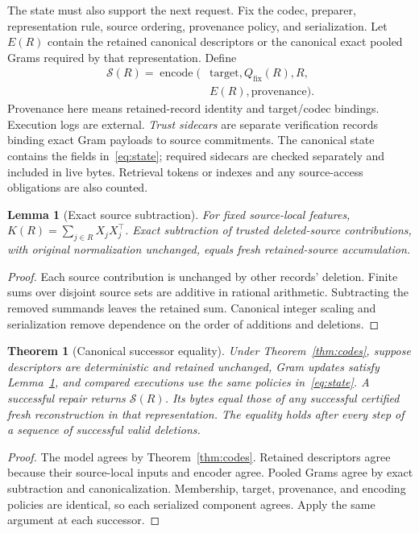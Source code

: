 \documentclass[11pt,a4paper]{article}
\newtheorem{theorem}{Theorem}
\newtheorem{lemma}{Lemma}
\newcommand{\Qfix}{Q_{\mathrm{fix}}}
\begin{document}
The state must also support the next request. Fix the codec, preparer,
representation rule, source ordering, provenance policy, and serialization.
Let $E(R)$ contain the retained canonical descriptors or the canonical exact
pooled Grams required by that representation. Define
\begin{equation}
 \begin{aligned}
 \mathcal S(R)=\operatorname{encode}\bigl(&\text{target},\Qfix(R),R,\\
                         &E(R),\text{provenance}\bigr).
 \end{aligned}
 \label{eq:state}
\end{equation}
Provenance here means retained-record identity and target/codec bindings.
Execution logs are external. \emph{Trust sidecars} are separate verification
records binding exact Gram payloads to source commitments. The canonical state
contains the fields in~\eqref{eq:state}; required sidecars are checked separately
and included in live bytes. Retrieval tokens or indexes and any source-access
obligations are also counted.

\begin{lemma}[Exact source subtraction]
\label{lem:subtract}
For fixed source-local features, $K(R)=\sum_{j\in R}X_jX_j^\top$.
Exact subtraction of trusted deleted-source contributions, with original
normalization unchanged, equals fresh retained-source accumulation.
\end{lemma}
\begin{proof}
Each source contribution is unchanged by other records' deletion. Finite sums
over disjoint source sets are additive in rational arithmetic. Subtracting the
removed summands leaves the retained sum. Canonical integer scaling and
serialization remove dependence on the order of additions and deletions.
\end{proof}

\begin{theorem}[Canonical successor equality]
\label{thm:state}
Under Theorem~\ref{thm:codes}, suppose descriptors are deterministic and retained
unchanged, Gram updates satisfy Lemma~\ref{lem:subtract}, and compared executions
use the same policies in~\eqref{eq:state}. A successful repair returns
$\mathcal S(R)$. Its bytes equal those of any successful certified fresh
reconstruction in that representation. The equality holds after every step of
a sequence of successful valid deletions.
\end{theorem}
\begin{proof}
The model agrees by Theorem~\ref{thm:codes}. Retained descriptors agree because
their source-local inputs and encoder agree. Pooled Grams agree by exact
subtraction and canonicalization. Membership, target, provenance, and encoding
policies are identical, so each serialized component agrees. Apply the same
argument at each successor.
\end{proof}
\end{document}
